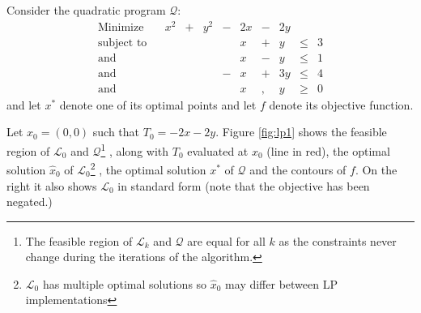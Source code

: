 Consider the quadratic program $\mathcal{Q}$:
\[
\begin{array}{lcrcrcrcrcl}
\textrm{Minimize}   & & x^2 &+& y^2 &-& 2 x &-& 2 y \\
\textrm{subject to} & &     & &     & &   x &+&   y &\leq& 3 \\
\textrm{and}        & &     & &     & &   x &-&   y &\leq& 1 \\
\textrm{and}        & &     & &     &-&   x &+& 3 y &\leq& 4 \\
\textrm{and}        & &     & &     & &   x &,&   y &\geq& 0
\end{array}
\]
and let $x^*$ denote one of its optimal points and let $f$ denote its objective
function.

Let $x_0 = (0,0)$ such that $T_0 = -2x - 2y$.
Figure \ref{fig:lp1} shows the feasible region of $\mathcal{L}_0$ and
$\mathcal{Q}$\footnote{
    The feasible region of $\mathcal{L}_k$ and $\mathcal{Q}$ are equal for all
    $k$ as the constraints never change during the iterations of the algorithm.
}
, along with $T_0$ evaluated at $x_0$ (line in red), the optimal solution
$\hat{x}_0$ of $\mathcal{L}_0$\footnote{
    $\mathcal{L}_0$ has multiple optimal solutions so $\hat{x}_0$ may differ
    between LP implementations
}
, the optimal solution $x^*$ of $\mathcal{Q}$ and the contours of $f$.
On the right it also shows $\mathcal{L}_0$ in standard form (note that the
objective has been negated.)




